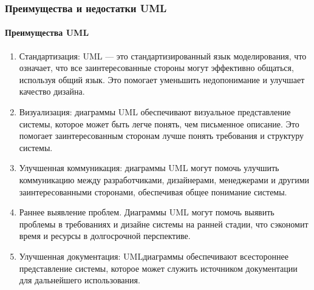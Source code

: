 \documentclass[letterpaper,10pt,russian]{sphinxmanual}
\begin{document}
\subsubsection{Преимущества и недостатки UML}
\label{\detokenize{educational_materials/uml/content:id6}}

\paragraph{Преимущества UML}
\label{\detokenize{educational_materials/uml/content:id7}}\begin{enumerate}
%
\item {} 
\sphinxAtStartPar
Стандартизация: UML — это стандартизированный язык моделирования, что означает, что все заинтересованные стороны могут эффективно общаться, используя общий язык. Это помогает уменьшить недопонимание и улучшает качество дизайна.

\item {} 
\sphinxAtStartPar
Визуализация: диаграммы UML обеспечивают визуальное представление системы, которое может быть легче понять, чем письменное описание. Это помогает заинтересованным сторонам лучше понять требования и структуру системы.

\item {} 
\sphinxAtStartPar
Улучшенная коммуникация: диаграммы UML могут помочь улучшить коммуникацию между разработчиками, дизайнерами, менеджерами и другими заинтересованными сторонами, обеспечивая общее понимание системы.

\item {} 
\sphinxAtStartPar
Раннее выявление проблем. Диаграммы UML могут помочь выявить проблемы в требованиях и дизайне системы на ранней стадии, что сэкономит время и ресурсы в долгосрочной перспективе.

\item {} 
\sphinxAtStartPar
Улучшенная документация: UML\sphinxhyphen{}диаграммы обеспечивают всестороннее представление системы, которое может служить источником документации для дальнейшего использования.

\end{enumerate}
\end{document}
